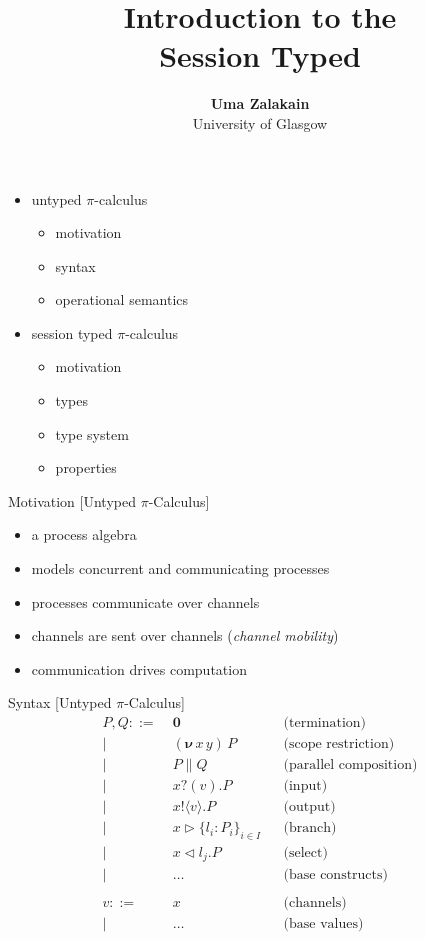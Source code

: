 \documentclass[dvipsnames]{beamer}
\date{}
\title{Introduction to the\\ Session Typed \Picalc{}}
\author{\textbf{Uma Zalakain}\\ University of Glasgow}
\newcommand{\sitem}{\item[\raisebox{.45ex}{\rule{.6ex}{.6ex}}]}
\newcommand{\picalc}{$\pi$-calculus}
\newcommand{\Picalc}{$\pi$-Calculus}
\newcommand{\PO}{\textbf{0}}
\newcommand{\comp}[2]{#1 \parallel #2}
\newcommand{\new}[2]{(\boldsymbol{\nu} \, #1 \, #2) \,}
\newcommand{\send}[2]{#1 !\langle #2 \rangle .}
\newcommand{\recv}[2]{#1 ?( #2 ) .}
\newcommand{\branch}[3]{#1 \triangleright \{ #2 \}_{#3}}
\newcommand{\select}[2]{#1 \triangleleft #2 .}
\newcommand{\slidetitle}[2]{#2 \hspace*{\fill} [#1]}
\begin{document}
  \maketitle

  \begin{frame}
    \begin{itemize}
      \setlength\itemsep{1em}
      \sitem untyped \picalc{}
        \begin{itemize}
          \sitem motivation
          \sitem syntax
          \sitem operational semantics
        \end{itemize}
      \sitem session typed \picalc{}
        \begin{itemize}
          \sitem motivation
          \sitem types
          \sitem type system
          \sitem properties
        \end{itemize}
    \end{itemize}
  \end{frame}

  \begin{frame}{\slidetitle{Untyped \Picalc{}}{Motivation}}
    \begin{itemize}
      \setlength\itemsep{1em}
      \sitem a process algebra
      \sitem models concurrent and communicating processes
      \sitem processes communicate over channels
      \sitem channels are sent over channels (\emph{channel mobility})
      \sitem communication drives computation
    \end{itemize}
  \end{frame}
  
  \begin{frame}{\slidetitle{Untyped \Picalc{}}{Syntax}}
    \begin{align*}
        P, Q ::=& \; \PO                     &&\text{(termination)}    \\ 
        |& \; \new{x}{y}P                    &&\text{(scope restriction)} \\ 
        |& \; \comp{P}{Q}                    &&\text{(parallel composition)} \\ 
        |& \; \recv{x}{v}P                   &&\text{(input)}       \\ 
        |& \; \send{x}{v}P                   &&\text{(output)}       \\           
        |& \; \branch{x}{l_i : P_i}{i \in I} &&\text{(branch)}       \\ 
        |& \; \select{x}{l_j}P               &&\text{(select)}       \\           
        |& \; \ldots                         &&\text{(base constructs)} \\
        \\
        v ::=& \; x && \text{(channels)}\\
        | & \; \ldots && \text{(base values)}\\
    \end{align*}
  \end{frame}
\end{document}
